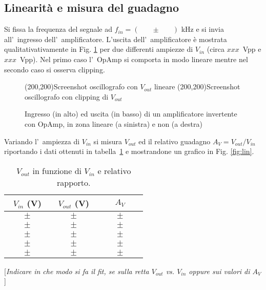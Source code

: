 \documentclass[10pt,a4paper]{article}
\newcommand{\rem}[1]{[\emph{#1}]}
\newcommand{\exn}{\phantom{xxx}}
\begin{document}
\subsection{Linearit\`a e misura del guadagno}
Si fissa la frequenza del segnale ad $f_{in} = (\exn \pm \exn)$ kHz e si invia all'~ingresso dell'~amplificatore.
L'uscita dell'~amplificatore \`e mostrata qualitativativamente in Fig. \ref{fig:oscinv} per due 
differenti ampiezze di $V_{in}$ (circa $xxx$~Vpp e $xxx$~Vpp). 
Nel primo caso l'~OpAmp si comporta in modo lineare mentre nel secondo caso si osserva clipping.   
%
\begin{figure}[h]
\begin{center}
\framebox(200,200){Screenshot oscillografo con $V_{out}$ lineare}
\framebox(200,200){Screenshot oscillografo con clipping di $V_{out}$}
\end{center}
\caption{\small Ingresso (in alto) ed uscita (in basso) di un amplificatore invertente con OpAmp, in 
zona lineare (a sinistra) e non (a destra)}
\label{fig:oscinv}
\end{figure}
%

Variando l'~ampiezza di $V_{in}$ si misura $V_{out}$ ed il relativo guadagno $A_V=V_{out}/V_{in}$ riportando i dati ottenuti in tabella~\ref{tab:guadagno} 
e mostrandone un grafico in Fig. \ref{fig:lin}. 

\begin{table}[h]
\caption{$V_{out}$ in funzione di $V_{in}$ e relativo rapporto.}
\label{tab:guadagno}
\begin{center}
\begin{tabular}{|c|c|c|}
\hline
$V_{in}$ (V) & $V_{out}$ (V)  & $A_V$ \\
\hline
\hline
$\exn \pm \exn $ & $\exn \pm \exn $ & $\exn \pm \exn$ \\
\hline
$\exn \pm \exn $ & $\exn \pm \exn $ & $\exn \pm \exn $ \\
\hline
$\exn \pm \exn $ & $\exn \pm \exn $ & $\exn \pm \exn $ \\
\hline
$\exn \pm \exn $ & $\exn \pm \exn $ & $\exn \pm \exn $ \\
\hline
$\exn \pm \exn $ & $\exn \pm \exn $ & $\exn \pm \exn $ \\
\hline
\end{tabular}
\end{center}
\end{table}

\rem{Indicare in che modo si fa il fit, se sulla retta $V_{out}$ vs. $V_{in}$ oppure sui valori di $A_V$   }
\end{document}
